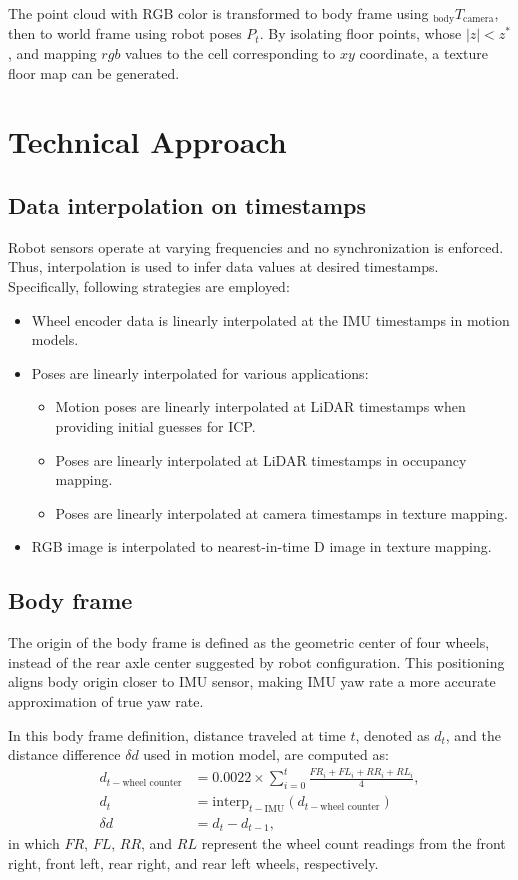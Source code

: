 \documentclass[conference]{IEEEtran}
\begin{document}
The point cloud with RGB color is 
transformed to body frame using $_{\text{body}}T_{\text{camera}}$,
then to world frame using robot poses $P_t$.
By isolating floor points, whose $|z| < z^*$,
and mapping $rgb$ values to the cell corresponding to $xy$ coordinate,
a texture floor map can be generated.

\section{Technical Approach}

\subsection{Data interpolation on timestamps}
Robot sensors operate at varying frequencies and no synchronization is enforced. 
Thus, interpolation is used to infer data values at desired timestamps.
Specifically, following strategies are employed:
\begin{itemize}
\item Wheel encoder data is linearly interpolated at the IMU timestamps in motion models. 
\item Poses are linearly interpolated for various applications:
\begin{itemize}
\item Motion poses are linearly interpolated at LiDAR timestamps when providing initial guesses for ICP.
\item Poses are linearly interpolated at LiDAR timestamps in occupancy mapping.
\item Poses are linearly interpolated at camera timestamps in texture mapping.
\end{itemize}
\item RGB image is interpolated to nearest-in-time D image in texture mapping.
\end{itemize}


\subsection{Body frame}
The origin of the body frame is defined as the geometric center of four wheels, 
instead of the rear axle center suggested by robot configuration. 
This positioning aligns body origin closer to IMU sensor, 
making IMU yaw rate a more accurate approximation of true yaw rate.

In this body frame definition, distance traveled at time $t$, 
denoted as $d_t$, and the distance difference $\delta d$ used in motion model, 
are computed as:
$$
\begin{aligned}
d_{t-\text{wheel counter}} &= 0.0022 \times \sum_{i=0}^{t} \frac{FR_i + FL_i + RR_i + RL_i}{4}, \\
d_{t} &= \text{interp}_{t-\text{IMU}}(d_{t-\text{wheel counter}})\\
\delta d &= d_{t} - d_{t-1},
\end{aligned}
$$
in which $FR$, $FL$, $RR$, and $RL$ represent the wheel count readings 
from the front right, front left, rear right, and rear left wheels, respectively.
\end{document}
